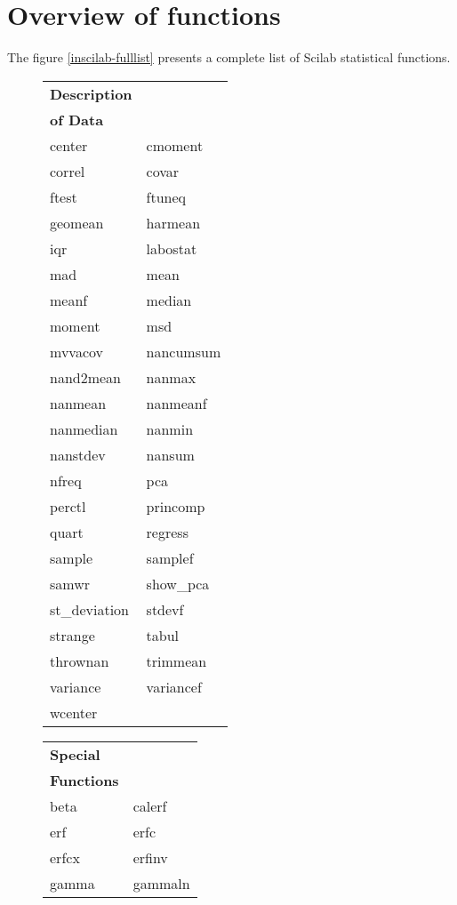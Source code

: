 \section{Overview of functions}

The figure \ref{inscilab-fulllist} presents a complete list 
of Scilab statistical functions.

\begin{figure}[htbp]
\begin{tabular}{|l|l|}
\hline
\textbf{Description} & \\
\textbf{of Data} & \\
\hline
center &     cmoment \\
correl &     covar  \\
ftest &     ftuneq  \\
geomean &    harmean  \\
iqr &    labostat  \\
mad &    mean  \\
meanf &    median  \\
moment &    msd  \\
mvvacov &    nancumsum  \\
nand2mean &    nanmax  \\
nanmean &    nanmeanf  \\
nanmedian &    nanmin  \\
nanstdev &    nansum  \\
nfreq &    pca  \\
perctl &    princomp  \\
quart &    regress  \\
sample &    samplef  \\
samwr &    show\_pca  \\
st\_deviation &    stdevf  \\
strange &    tabul  \\
thrownan &    trimmean  \\
variance &    variancef  \\
wcenter & \\
\hline
\end{tabular}
\begin{tabular}{|l|l|}
\hline
\textbf{Special} & \\
\textbf{Functions} & \\
\hline
beta & calerf \\
erf & erfc \\
erfcx & erfinv \\
gamma & gammaln \\
\hline
\hline

\end{tabular}
\end{figure}
